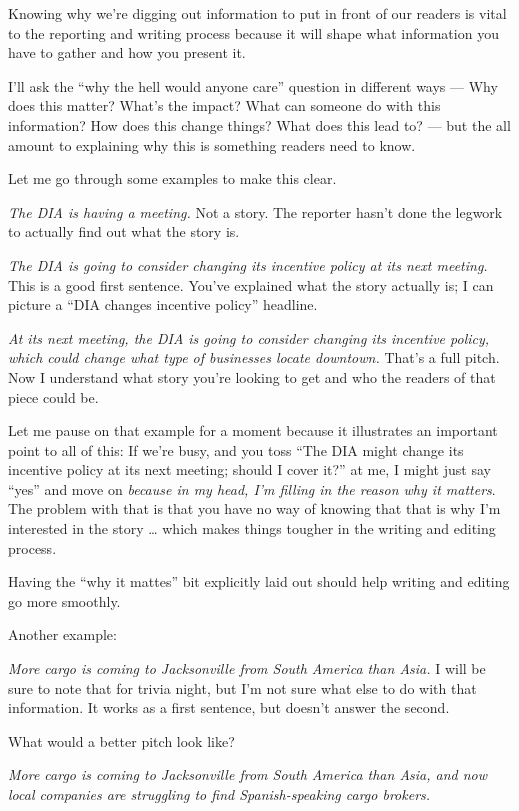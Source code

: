 \documentclass[
  11pt,
  american,
  letterpaperpaper,
  extrafontsizes,onecolumn,openright
  ]{memoir}
\begin{document}
Knowing why we're digging out information to put in front of our readers is vital to the reporting and writing process because it will shape what information you have to gather and how you present it.

I'll ask the \enquote{why the hell would anyone care} question in different ways --- Why does this matter? What's the impact? What can someone do with this information? How does this change things? What does this lead to? --- but the all amount to explaining why this is something readers need to know.

Let me go through some examples to make this clear.

\emph{The DIA is having a meeting.} Not a story. The reporter hasn't done the legwork to actually find out what the story is.

\emph{The DIA is going to consider changing its incentive policy at its next meeting.} This is a good first sentence. You've explained what the story actually is; I can picture a \enquote{DIA changes incentive policy} headline.

\emph{At its next meeting, the DIA is going to consider changing its incentive policy, which could change what type of businesses locate downtown.} That's a full pitch. Now I understand what story you're looking to get and who the readers of that piece could be.

Let me pause on that example for a moment because it illustrates an important point to all of this: If we're busy, and you toss \enquote{The DIA might change its incentive policy at its next meeting; should I cover it?} at me, I might just say \enquote{yes} and move on \emph{because in my head, I'm filling in the reason why it matters}. The problem with that is that you have no way of knowing that that is why I'm interested in the story \ldots{} which makes things tougher in the writing and editing process.

Having the \enquote{why it mattes} bit explicitly laid out should help writing and editing go more smoothly.

Another example:

\emph{More cargo is coming to Jacksonville from South America than Asia.} I will be sure to note that for trivia night, but I'm not sure what else to do with that information. It works as a first sentence, but doesn't answer the second.

What would a better pitch look like?

\emph{More cargo is coming to Jacksonville from South America than Asia, and now local companies are struggling to find Spanish-speaking cargo brokers.}
\end{document}
